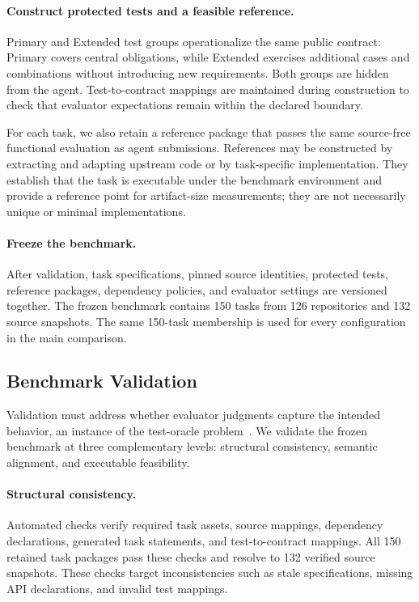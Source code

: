 \documentclass[acmsmall,screen,review,anonymous]{acmart}
\begin{document}
\paragraph{Construct protected tests and a feasible reference.}
Primary and Extended test groups operationalize the same public contract:
Primary covers central obligations, while Extended exercises additional cases
and combinations without introducing new requirements. Both groups are hidden
from the agent. Test-to-contract mappings are maintained during construction to
check that evaluator expectations remain within the declared boundary.

For each task, we also retain a reference package that passes the same
source-free functional evaluation as agent submissions. References may be
constructed by extracting and adapting upstream code or by task-specific
implementation. They establish that the task is executable under the benchmark
environment and provide a reference point for artifact-size measurements;
they are not necessarily unique or minimal implementations.

\paragraph{Freeze the benchmark.}
After validation, task specifications, pinned source identities, protected
tests, reference packages, dependency policies, and evaluator settings are
versioned together. The frozen benchmark contains 150 tasks from 126
repositories and 132 source snapshots. The same 150-task membership is used for
every configuration in the main comparison.

\subsection{Benchmark Validation}
\label{sec:validation}

Validation must address whether evaluator judgments capture the intended
behavior, an instance of the test-oracle problem~\cite{barr2015oracle}.
We validate the frozen benchmark at three complementary levels: structural
consistency, semantic alignment, and executable feasibility.

\paragraph{Structural consistency.}
Automated checks verify required task assets, source mappings, dependency
declarations, generated task statements, and test-to-contract mappings. All 150
retained task packages pass these checks and resolve to 132 verified source
snapshots. These checks target inconsistencies such as stale specifications,
missing API declarations, and invalid test mappings.
\end{document}
